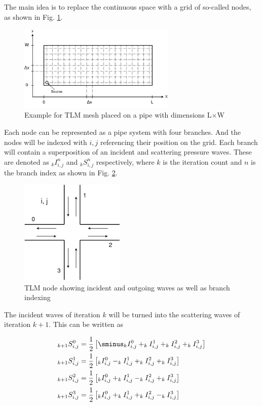 \documentclass[twocolumn]{article}
\begin{document}
The main idea is to replace the continuous space with a grid of so-called nodes,
as shown in Fig. \ref{fig_tlm_mesh}.

\begin{figure}[H]
    \centering
    \includegraphics[width=75mm]{./Images/tlm_pipe.png}
    \caption{Example for TLM mesh placed on a pipe with dimensions L$\times$W}
    \label{fig_tlm_mesh}
\end{figure}

Each node can be represented as a pipe system with four branches.
And the nodes will be indexed with $i, j$ referencing their position on the grid.
Each branch will contain a superposition of an incident and scattering pressure waves.
These are denoted as $_{k}I_{i,j}^{n}$ and $_{k}S_{i,j}^{n}$ respectively, where
$k$ is the iteration count and $n$ is the branch index as shown in Fig.
\ref{fig_tlm_node}.

\begin{figure}[H]
    \centering
    \includegraphics[width=50mm]{./Images/tlm_node.png}
    \caption{TLM node showing incident and outgoing waves as well as branch indexing}
    \label{fig_tlm_node}
\end{figure}

The incident waves of iteration $k$ will be turned into the scattering waves of
iteration $k+1$.
This can be written as

\begin{equation}
\begin{aligned}
    _{k+1}S_{i,j}^{0} &= \frac{1}{2}\left[\sminus_kI_{i,j}^{0}+_kI_{i,j}^{1}+_kI_{i,j}^{2}+_kI_{i,j}^{3}\right] \\
    _{k+1}S_{i,j}^{1} &= \frac{1}{2}\left[_kI_{i,j}^{0}-_kI_{i,j}^{1}+_kI_{i,j}^{2}+_kI_{i,j}^{3}\right] \\
    _{k+1}S_{i,j}^{2} &= \frac{1}{2}\left[_kI_{i,j}^{0}+_kI_{i,j}^{1}-_kI_{i,j}^{2}+_kI_{i,j}^{3}\right] \\
    _{k+1}S_{i,j}^{3} &= \frac{1}{2}\left[_kI_{i,j}^{0}+_kI_{i,j}^{1}+_kI_{i,j}^{2}-_kI_{i,j}^{3}\right] \\
\end{aligned}
\end{equation}
\end{document}
